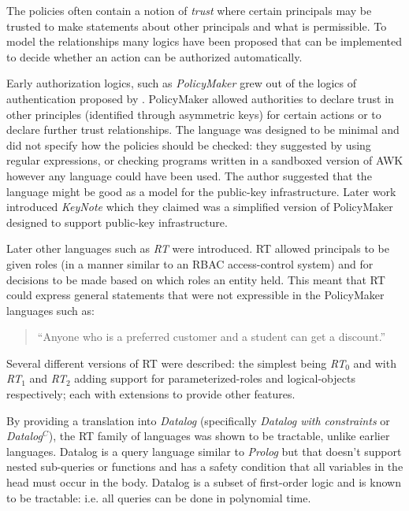 \documentclass[a4paper,12pt,sfsidenotes]{tufte-book}
\begin{document}
The policies often contain a notion of \emph{trust} where certain principals
may be trusted to make statements about other principals and what is
permissible. To model the relationships many logics have been proposed that can
be implemented to decide whether an action can be authorized automatically.

Early authorization logics, such as \emph{PolicyMaker}\cite{Blaze:dj} grew out
of the logics of authentication proposed by
\citeauthor*{Wobber:1994dh}\cite{Lampson:1992jg}\cite{Wobber:1994dh}.
PolicyMaker allowed authorities to declare trust in other principles (identified
through asymmetric keys) for certain actions or to declare further trust
relationships. The language was designed to be minimal and did not specify how
the policies should be checked: they suggested by using regular expressions, or
checking programs written in a sandboxed version of AWK however any language
could have been used. The author suggested that the language might be good as a
model for the public-key infrastructure. Later work introduced
\emph{KeyNote}\cite{Blaze:1999fa} which they claimed was a simplified version of
PolicyMaker designed to support public-key infrastructure.

Later other languages such as \emph{RT}\cite{Li:2002if} were introduced. RT
allowed principals to be given roles (in a manner similar to an \ac{RBAC}
access-control system) and for decisions to be made based on which roles an
entity held. This meant that RT could express general statements that were not
expressible in the PolicyMaker languages such as:
\begin{quote}
  ``Anyone who is a preferred customer and a student can get a discount.''
\end{quote}
Several different versions of RT were described: the simplest being
\emph{RT$_0$}\cite{Li:2003tj} and with \emph{RT$_1$} and \emph{RT$_2$} adding support for
parameterized-roles and logical-objects respectively; each with extensions to
provide other features.

By providing a translation into \emph{Datalog} (specifically \emph{Datalog with
  constraints} or \emph{Datalog$^C$\cite{Li:2003ix}}), the RT family of
languages was shown to be tractable, unlike earlier languages. Datalog is a
query language similar to \emph{Prolog} but that doesn't support nested
sub-queries or functions and has a safety condition that all variables in
the head must occur in the body. Datalog is a subset of first-order logic
and is known to be tractable: i{.}e{.} all queries can be done in polynomial
time.
\end{document}
